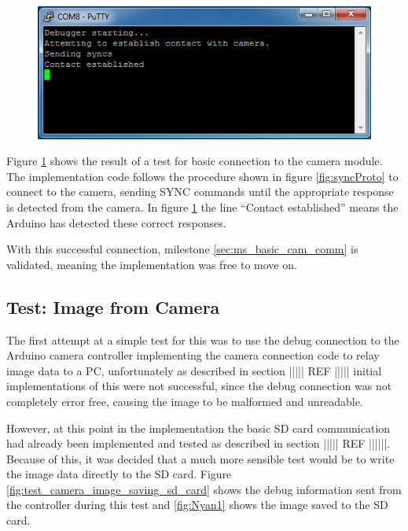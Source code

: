 \begin{figure}[H]
        \centering
        \includegraphics[width=1.0\textwidth]{testing_screenshots/camera_basic_connection_test.png}
        \label{fig:test_basic_connection}
\end{figure}

Figure \ref{fig:test_basic_connection} shows the result of a test for basic connection to the camera module. The implementation code follows the procedure shown in figure \ref{fig:syncProto} to connect to the camera, sending SYNC commands until the appropriate response is detected from the camera. In figure \ref{fig:test_basic_connection} the line ``Contact established'' means the Arduino has detected these correct responses.

With this successful connection, milestone \ref{sec:ms_basic_cam_comm} is validated, meaning the implementation was free to move on.

\subsection{Test: Image from Camera}
\label{sec:image_capture_test}

The first attempt at a simple test for this was to use the debug connection to the Arduino camera controller implementing the camera connection code to relay image data to a PC, unfortunately as described in section ||||| REF ||||| initial implementations of this were not successful, since the debug connection was not completely error free, causing the image to be malformed and unreadable.

However, at this point in the implementation the basic SD card communication had already been implemented and tested as described in section ||||| REF ||||||. Because of this, it was decided  that a much more sensible test would be to write the image data directly to the SD card. Figure \ref{fig:test_camera_image_saving_sd_card} shows the debug information sent from the controller during this test and \ref{fig:Nyan1} shows the image saved to the SD card.

